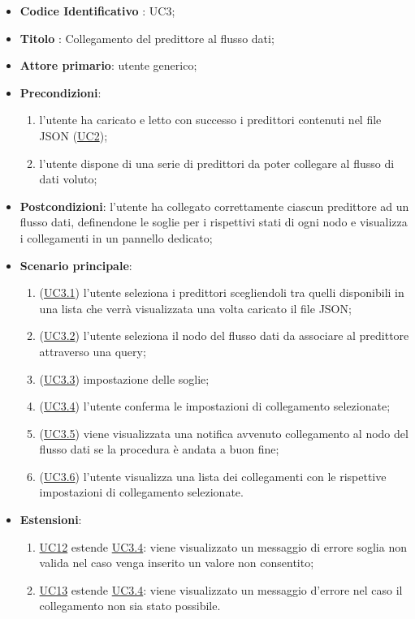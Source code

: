 		\begin{itemize}
			\item\textbf{Codice Identificativo} : UC3;
			\item\textbf{Titolo} : Collegamento del predittore al flusso dati;
			\item\textbf{Attore primario}: utente generico;
			\item\textbf{Precondizioni}:
				\begin{enumerate}
					\item l'utente ha caricato e letto con successo i predittori contenuti nel file JSON (\hyperref[par:UC2]{UC2});
					\item l'utente dispone di una serie di predittori da poter collegare al flusso di dati voluto;
					
				\end{enumerate}
			\item\textbf{Postcondizioni}: l'utente ha collegato correttamente ciascun predittore ad un flusso dati, definendone le soglie per i rispettivi stati di ogni nodo e visualizza i collegamenti in un pannello dedicato;
			\item\textbf{Scenario principale}:
				\begin{enumerate}
					\item (\hyperref[par:UC3.1]{UC3.1}) l'utente seleziona i predittori scegliendoli tra quelli disponibili in una lista che verrà visualizzata una volta caricato il file JSON;
					\item (\hyperref[par:UC3.2]{UC3.2}) l'utente seleziona il nodo del flusso dati da associare al predittore attraverso una query\glo;
					\item (\hyperref[par:UC3.3]{UC3.3}) impostazione delle soglie;
					\item (\hyperref[par:UC3.4]{UC3.4}) l'utente conferma le impostazioni di collegamento selezionate;	
					\item (\hyperref[par:UC3.5]{UC3.5}) viene visualizzata una notifica avvenuto collegamento al nodo del flusso dati se la procedura è andata a buon fine;
					\item (\hyperref[par:UC3.6]{UC3.6}) l'utente visualizza una lista dei collegamenti con le rispettive impostazioni di collegamento selezionate.
				\end{enumerate}
			\item\textbf{Estensioni}:
				\begin{enumerate}
					\item\hyperref[par:UC12]{UC12} estende \hyperref[par:UC3.4]{UC3.4}: viene visualizzato un messaggio di errore soglia non valida nel caso venga inserito un valore non consentito;
					\item\hyperref[par:UC13]{UC13} estende \hyperref[par:UC3.4]{UC3.4}: viene visualizzato un messaggio d'errore nel caso il collegamento non sia stato possibile.
						
				\end{enumerate}
		\end{itemize}
		

